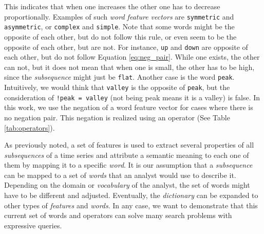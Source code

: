 This indicates that when one increases the other one has to decrease proportionally. Examples of such \textit{word feature vectors} are \texttt{symmetric} and \texttt{asymmetric}, or \texttt{complex} and \texttt{simple}. Note that some words might be the opposite of each other, but do not follow this rule, or even seem to be the opposite of each other, but are not. For instance, \texttt{up} and \texttt{down} are opposite of each other, but do not follow Equation \ref{eq:neg_pair}. While one exists, the other can not, but it does not mean that when one is small, the other has to be high, since the \textit{subsequence} might just be \texttt{flat}. Another case is the word \texttt{peak}. Intuitively, we would think that \texttt{valley} is the opposite of \texttt{peak}, but the consideration of \texttt{!peak = valley} (not being peak means it is a valley) is false. In this work, we use the negation of a word feature vector for cases where there is no negation pair. This negation is realized using an operator (See Table \ref{tab:operators}).
\par
As previously noted, a set of features is used to extract several properties of all \textit{subsequences} of a time series and attribute a semantic meaning to each one of them by mapping it to a specific \textit{word}. It is our assumption that a \textit{subsequence} can be mapped to a set of \textit{words} that an analyst would use to describe it. Depending on the domain or \textit{vocabulary} of the analyst, the set of words might have to be different and adjusted. Eventually, the \textit{dictionary} can be expanded to other types of \textit{features} and \textit{words}. In any case, we want to demonstrate that this current set of words and operators can solve many search problems with expressive queries.

